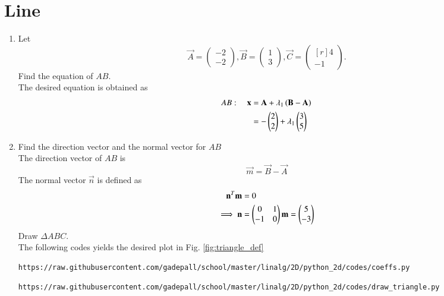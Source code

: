 \documentclass[journal,12pt,twocolumn]{IEEEtran}
\renewcommand\thesection{\arabic{section}}
\begin{document}
\section{Line}
\begin{enumerate}[label=\thesection.\arabic*
,ref=\thesection.\theenumi]
%
\item
\label{prob:draw_triangle}
Let
\begin{equation}
\vec{A} =
\begin{pmatrix}
-2
\\
-2
\end{pmatrix},
\vec{B} =
\begin{pmatrix}
1
\\
3
\end{pmatrix},
\vec{C} =
\begin{pmatrix*}[r]
4
\\
-1
\end{pmatrix*}.
\end{equation}
%
Find the equation of $AB$.
\\
\solution  The desired equation is obtained as
\begin{align}
\label{eq:line_dir}
AB: \quad \mathbf{x} &= \mathbf{A}+ \lambda_1 \left(\mathbf{B}-\mathbf{A}\right)
\\
&= -\begin{pmatrix}2\\2\end{pmatrix}+ \lambda_1\begin{pmatrix}3\\5\end{pmatrix}
\end{align}
%
\item Find the direction vector and the normal vector for $AB$
\\
\solution 
The direction vector of $AB$ is 
\begin{equation}
\label{eq:dir_vec}
\vec{m} = \vec{B}-\vec{A} 
\end{equation}
%
The normal vector $\vec{n}$ is defined as
\begin{align}
\label{eq:line_nor}
\mathbf{n}^T\mathbf{m} &= 0
\\
\implies \mathbf{n}&= \begin{pmatrix}0 & 1 \\ -1 & 0\end{pmatrix}\mathbf{m} = \begin{pmatrix}5\\-3\end{pmatrix}
\end{align}
%
Draw $\Delta ABC$.
\\
\solution
The following codes yields the desired plot in Fig. \ref{fig:triangle_def}
\begin{lstlisting}
https://raw.githubusercontent.com/gadepall/school/master/linalg/2D/python_2d/codes/coeffs.py
\end{lstlisting}
\begin{lstlisting}
https://raw.githubusercontent.com/gadepall/school/master/linalg/2D/python_2d/codes/draw_triangle.py
\end{lstlisting}


\end{enumerate}
\end{document}
